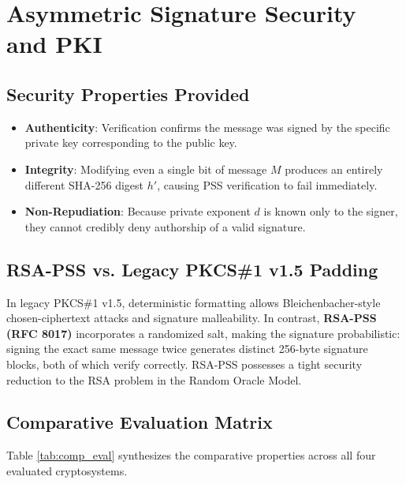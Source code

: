 \documentclass[12pt,a4paper]{report}
\begin{document}
\section{Asymmetric Signature Security and PKI}
\subsection{Security Properties Provided}
\begin{itemize}
    \item \textbf{Authenticity}: Verification confirms the message was signed by the specific private key corresponding to the public key.
    \item \textbf{Integrity}: Modifying even a single bit of message $M$ produces an entirely different SHA-256 digest $h'$, causing PSS verification to fail immediately.
    \item \textbf{Non-Repudiation}: Because private exponent $d$ is known only to the signer, they cannot credibly deny authorship of a valid signature.
\end{itemize}

\subsection{RSA-PSS vs. Legacy PKCS\#1 v1.5 Padding}
In legacy PKCS\#1 v1.5, deterministic formatting allows Bleichenbacher-style chosen-ciphertext attacks and signature malleability. In contrast, \textbf{RSA-PSS (RFC 8017)} incorporates a randomized salt, making the signature probabilistic: signing the exact same message twice generates distinct 256-byte signature blocks, both of which verify correctly. RSA-PSS possesses a tight security reduction to the RSA problem in the Random Oracle Model.

\subsection{Comparative Evaluation Matrix}
Table \ref{tab:comp_eval} synthesizes the comparative properties across all four evaluated cryptosystems.
\end{document}
